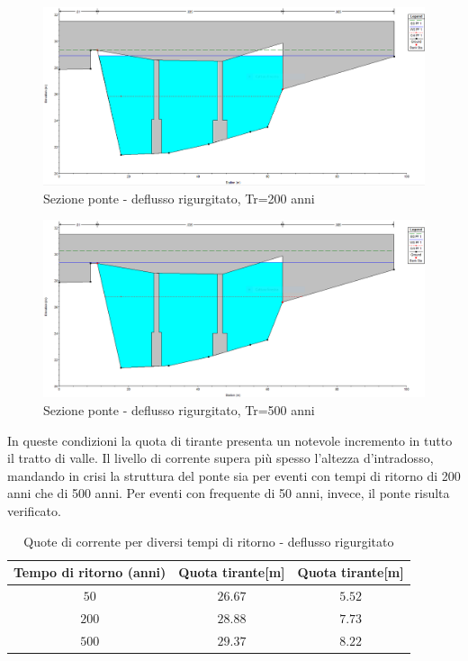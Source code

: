 \documentclass[12pt]{article} %
\begin{document}
\begin{figure}[H]
    \centering
    \includegraphics[scale=0.5]{PonteUP8.PNG}
    \caption{Sezione ponte - deflusso rigurgitato, Tr=200 anni}
\end{figure}

\begin{figure}[H]
    \centering
    \includegraphics[scale=0.5]{PonteUP82.PNG}
    \caption{Sezione ponte - deflusso rigurgitato, Tr=500 anni}
\end{figure}

\noindent In queste condizioni la quota di tirante presenta un notevole incremento in tutto il tratto di valle. Il livello di corrente supera più spesso l'altezza d'intradosso, mandando in crisi la struttura del ponte sia per eventi con tempi di ritorno di 200 anni che di 500 anni. Per eventi con frequente di 50 anni, invece, il ponte risulta verificato.

\begin{table}[H]
    \centering
    \begin{tabular}{ccc}
        \hline
        \textbf{Tempo di ritorno (anni)} &\textbf{Quota tirante[m]}& \textbf{Quota tirante[m]} \\
        \hline
        $50$ & $26.67$ & $5.52$\\
        $200$ & $28.88$ & $7.73$\\
        $500$ & $29.37$ & $8.22$\\
        \hline
    \end{tabular}
    \caption{Quote di corrente per diversi tempi di ritorno - deflusso rigurgitato}
\end{table}
\end{document}

